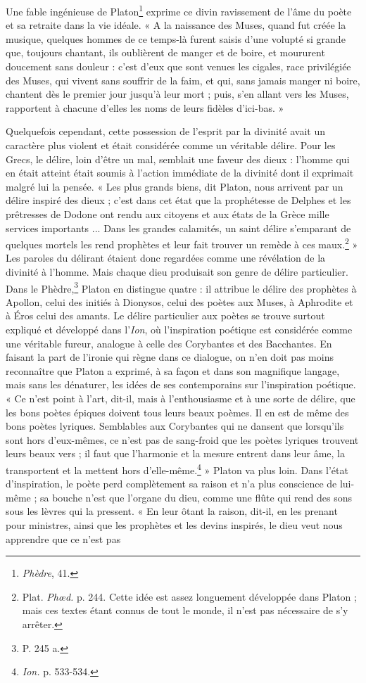 \documentclass[landscape, a4paper, 11pt, oneside, polutonikogreek, french]{article}
\begin{document}
Une fable ingénieuse de Platon\footnote{\emph{Phèdre}, 41.} exprime ce divin ravissement de l'âme du poète et sa retraite dans la vie idéale. « A la naissance des Muses, quand fut créée la musique, quelques hommes de ce temps-là furent saisis d'une volupté si grande que, toujours chantant, ils oublièrent de manger et de boire, et moururent doucement sans douleur : c'est d'eux que sont venues les cigales, race privilégiée des Muses, qui vivent sans souffrir de la faim, et qui, sans jamais manger ni boire, chantent dès le premier jour jusqu'à leur mort ; puis, s'en allant vers les Muses, rapportent à chacune d'elles les noms de leurs fidèles d'ici-bas. »

Quelquefois cependant, cette possession de l'esprit par la divinité avait un caractère plus violent et était considérée comme un véritable délire. Pour les Grecs, le délire, loin d'être un mal, semblait une faveur des dieux : l'homme qui en était atteint était soumis à l'action immédiate de la divinité dont il exprimait malgré lui la pensée. « Les plus grands biens, dit Platon, nous arrivent par un délire inspiré des dieux ; c'est dans cet état que la prophétesse de Delphes et les prêtresses de Dodone ont rendu aux citoyens et aux états de la Grèce mille services importants ... Dans les grandes calamités, un saint délire s'emparant de quelques mortels les rend prophètes et leur fait trouver un remède à ces maux.\footnote{Plat. \emph{Phœd.} p. 244. Cette idée est assez longuement développée dans Platon ; mais ces textes étant connus de tout le monde, il n'est pas nécessaire de s'y arrêter.} » Les paroles du délirant étaient donc regardées comme une révélation de la divinité à l'homme. Mais chaque dieu produisait son genre de délire particulier. Dans le Phèdre,\footnote{P. 245 a.} Platon en distingue quatre : il attribue le délire des prophètes à Apollon, celui des initiés à Dionysos, celui des poètes aux Muses, à Aphrodite et à Éros celui des amants. Le délire particulier aux poètes se trouve surtout expliqué et développé dans l'\emph{Ion}, où l'inspiration poétique est considérée comme une véritable fureur, analogue à celle des Corybantes et des Bacchantes. En faisant la part de l'ironie qui règne dans ce dialogue, on n'en doit pas moins reconnaître que Platon a exprimé, à sa façon et dans son magnifique langage, mais sans les dénaturer, les idées de ses contemporains sur l'inspiration poétique. « Ce n'est point à l'art, dit-il, mais à l'enthousiasme et à une sorte de délire, que les bons poètes épiques doivent tous leurs beaux poèmes. Il en est de même des bons poètes lyriques. Semblables aux Corybantes qui ne dansent que lorsqu'ils sont hors d'eux-mêmes, ce n'est pas de sang-froid que les poètes lyriques trouvent leurs beaux vers ; il faut que l'harmonie et la mesure entrent dans leur âme, la transportent et la mettent hors d'elle-même.\footnote{\emph{Ion.} p. 533-534.} » Platon va plus loin. Dans l'état d'inspiration, le poète perd complètement sa raison et n'a plus conscience de lui-même ; sa bouche n'est que l'organe du dieu, comme une flûte qui rend des sons sous les lèvres qui la pressent. « En leur ôtant la raison, dit-il, en les prenant pour ministres, ainsi que les prophètes et les devins inspirés, le dieu veut nous apprendre que ce n'est pas 
\end{document}
